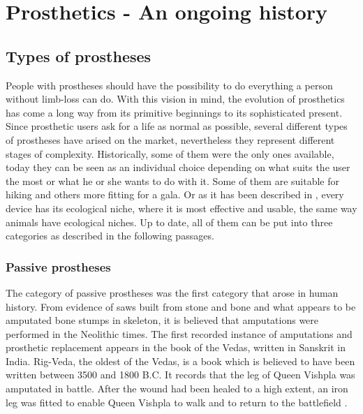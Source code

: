 \documentclass[main]{subfiles}
\begin{document}
\chapter{Prosthetics - An ongoing history} %

\label{Chapter2} %



\section{Types of prostheses}

People with prostheses should have the possibility to do everything a person without limb-loss can do. With this vision in mind, the evolution of prosthetics has come a long way from its primitive beginnings to its sophisticated present. Since prosthetic users ask for a life as normal as possible, several different types of prostheses have arised on the market, nevertheless they represent different stages of complexity. Historically, some of them were the only ones available, today they can be seen as an individual choice depending on what suits the user the most or what he or she wants to do with it. Some of them are suitable for hiking and others more fitting for a gala. Or as it has been described in \cite{Pfeifer2006}, every device has its ecological niche, where it is most effective and usable, the same way animals have ecological niches. Up to date, all of them can be put into three categories as described in the following passages.

\subsection{Passive prostheses}
The category of passive prostheses was the first category that arose in human history. From evidence of saws built from stone and bone and what appears to be amputated bone stumps in skeleton, it is believed that amputations were performed in the Neolithic times. The first recorded instance of amputations and prosthetic replacement appears in the book of the Vedas, written in Sanskrit in India. Rig-Veda, the oldest of the Vedas, is a book which is believed to have been written between 3500 and 1800 B.C. It records that the leg of Queen Vishpla was amputated in battle. After the wound had been healed to a high extent, an iron leg was fitted to enable Queen Vishpla to walk and to return to the battlefield \cite{history-of-amputations}.
\end{document}
